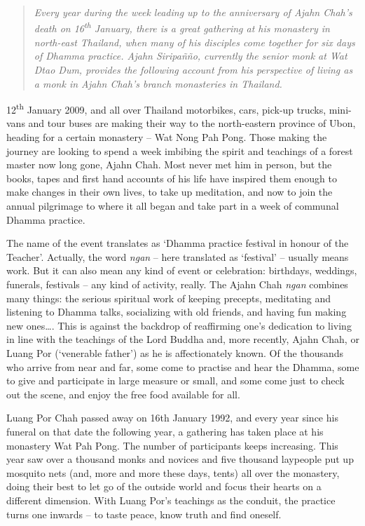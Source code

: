
\begin{quote}\itshape
Every year during the week leading up to the anniversary of Ajahn
Chah's death on 16\textsuperscript{th} January, there is a great
gathering at his monastery in north-east Thailand, when many of his
disciples come together for six days of Dhamma practice. Ajahn
Siripañño, currently the senior monk at Wat Dtao Dum, provides the
following account from his perspective of living as a monk in Ajahn
Chah's branch monasteries in Thailand.
\end{quote}

12\textsuperscript{th} January 2009, and all over Thailand motorbikes,
cars, pick-up trucks, mini-vans and tour buses are making their way to
the north-eastern province of Ubon, heading for a certain monastery --
Wat Nong Pah Pong. Those making the journey are looking to spend a week
imbibing the spirit and teachings of a forest master now long gone,
Ajahn Chah. Most never met him in person, but the books, tapes and
first hand accounts of his life have inspired them enough to make changes
in their own lives, to take up meditation, and now to join the annual
pilgrimage to where it all began and take part in a week of communal
Dhamma practice. 

The name of the event translates as `Dhamma practice festival in honour
of the Teacher'. Actually, the word \emph{ngan} -- here translated as
`festival' -- usually means work. But it can also mean any kind of event
or celebration: birthdays, weddings, funerals, festivals -- any kind of
activity, really. The Ajahn Chah \emph{ngan} combines many things: the
serious spiritual work of keeping precepts, meditating and listening to
Dhamma talks, socializing with old friends, and having fun making new
ones\ldots{}. This is against the backdrop of reaffirming one's
dedication to living in line with the teachings of the Lord Buddha and, 
more recently, Ajahn Chah, or Luang Por (`venerable father') as he is
affectionately known. Of the thousands who arrive from near and far, 
some come to practise and hear the Dhamma, some to give and participate
in large measure or small, and some come just to check out the scene, 
and enjoy the free food available for all. 

Luang Por Chah passed away on 16th January 1992, and every year since
his funeral on that date the following year, a gathering has taken place
at his monastery Wat Pah Pong. The number of participants keeps
increasing. This year saw over a thousand monks and novices and five
thousand laypeople put up mosquito nets (and, more and more these days, 
tents) all over the monastery, doing their best to let go of the outside
world and focus their hearts on a different dimension. With Luang Por's
teachings as the conduit, the practice turns one inwards -- to taste
peace, know truth and find oneself. 

